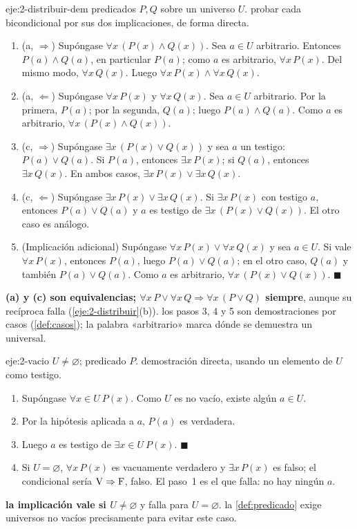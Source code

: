 \begin{solucion}{eje:2-distribuir-dem}
\datos predicados $P,Q$ sobre un universo $U$.
\planteamiento probar cada bicondicional por sus dos implicaciones, de forma directa.
\pasos
\begin{enumerate}[label=\arabic*.]
  \item (a, $\Rightarrow$) Supóngase $\forall x\,(P(x)\wedge Q(x))$. Sea $a\in U$ arbitrario. Entonces $P(a)\wedge Q(a)$, en particular $P(a)$; como $a$ es arbitrario, $\forall x\,P(x)$. Del mismo modo, $\forall x\,Q(x)$. Luego $\forall x\,P(x)\wedge\forall x\,Q(x)$.
  \item (a, $\Leftarrow$) Supóngase $\forall x\,P(x)$ y $\forall x\,Q(x)$. Sea $a\in U$ arbitrario. Por la primera, $P(a)$; por la segunda, $Q(a)$; luego $P(a)\wedge Q(a)$. Como $a$ es arbitrario, $\forall x\,(P(x)\wedge Q(x))$.
  \item (c, $\Rightarrow$) Supóngase $\exists x\,(P(x)\vee Q(x))$ y sea $a$ un testigo: $P(a)\vee Q(a)$. Si $P(a)$, entonces $\exists x\,P(x)$; si $Q(a)$, entonces $\exists x\,Q(x)$. En ambos casos, $\exists x\,P(x)\vee\exists x\,Q(x)$.
  \item (c, $\Leftarrow$) Supóngase $\exists x\,P(x)\vee\exists x\,Q(x)$. Si $\exists x\,P(x)$ con testigo $a$, entonces $P(a)\vee Q(a)$ y $a$ es testigo de $\exists x\,(P(x)\vee Q(x))$. El otro caso es análogo.
  \item (Implicación adicional) Supóngase $\forall x\,P(x)\vee\forall x\,Q(x)$ y sea $a\in U$. Si vale $\forall x\,P(x)$, entonces $P(a)$, luego $P(a)\vee Q(a)$; en el otro caso, $Q(a)$ y también $P(a)\vee Q(a)$. Como $a$ es arbitrario, $\forall x\,(P(x)\vee Q(x))$. $\blacksquare$
\end{enumerate}
\resultado \textbf{(a) y (c) son equivalencias; $\forall x\,P\vee\forall x\,Q\Rightarrow\forall x\,(P\vee Q)$ siempre}, aunque su recíproca falla (\cref{eje:2-distribuir}(b)).
\comprobacion los pasos 3, 4 y 5 son demostraciones por casos (\cref{def:casos}); la palabra «arbitrario» marca dónde se demuestra un universal.
\end{solucion}

\begin{solucion}{eje:2-vacio}
\datos $U\neq\varnothing$; predicado $P$.
\planteamiento demostración directa, usando un elemento de $U$ como testigo.
\pasos
\begin{enumerate}[label=\arabic*.]
  \item Supóngase $\forall x\in U\ P(x)$. Como $U$ es no vacío, existe algún $a\in U$.
  \item Por la hipótesis aplicada a $a$, $P(a)$ es verdadera.
  \item Luego $a$ es testigo de $\exists x\in U\ P(x)$. $\blacksquare$
  \item Si $U=\varnothing$, $\forall x\,P(x)$ es vacuamente verdadero y $\exists x\,P(x)$ es falso; el condicional sería $\mathrm{V}\Rightarrow\mathrm{F}$, falso. El paso~1 es el que falla: no hay ningún $a$.
\end{enumerate}
\resultado \textbf{la implicación vale si $U\neq\varnothing$} y falla para $U=\varnothing$.
\comprobacion la \cref{def:predicado} exige universos no vacíos precisamente para evitar este caso.
\end{solucion}

